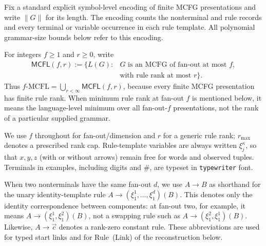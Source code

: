 \documentclass[11pt]{article}
\numberwithin{equation}{section}
\theoremstyle{plain}
\theoremstyle{definition}
\theoremstyle{remark}
\newcommand{\tuple}[1]{\vec{#1}}
\begin{document}
Fix a standard explicit symbol-level encoding of finite MCFG presentations and
write $\|G\|$ for its length.  The encoding counts the nonterminal and rule
records and every terminal or variable occurrence in each rule template.  All
polynomial grammar-size bounds below refer to this encoding.

For integers \(f\ge1\) and \(r\ge0\), write
\[
\begin{aligned}
  \mathsf{MCFL}(f,r):=\{L(G):{}&G\text{ is an MCFG of fan-out at most }f,\\
                   &\text{with rule rank at most }r\}.
\end{aligned}
\]
Thus \(f\text{-}\mathrm{MCFL}=\bigcup_{r<\infty}\mathsf{MCFL}(f,r)\), because every
finite MCFG presentation has finite rule rank.
When minimum rule rank at fan-out \(f\) is mentioned below, it means the
language-level minimum over all fan-out-\(f\) presentations, not the rank of a
particular supplied grammar.


We use $f$ throughout for fan-out/dimension and $r$ for a generic rule rank;
$r_{\max}$ denotes a prescribed rank cap.  Rule-template variables are always
written $\xi_j^\kappa$, so that $x,y,z$ (with or without arrows) remain free for
words and observed tuples.  Terminals in examples, including digits and
$\mathtt\#$, are typeset in \texttt{typewriter} font.


When two nonterminals have the same fan-out \(d\), we use
\(A\to B\)
as shorthand for the unary identity-template rule
\(A\to(\xi_1^1,\ldots,\xi_1^d)(B)\).  This denotes only the identity
correspondence between components: at fan-out two, for example, it means
\(A\to(\xi_1^1,\xi_1^2)(B)\), not a swapping rule such as
\(A\to(\xi_1^2,\xi_1^1)(B)\).
Likewise, \(A\to\tuple c\) denotes a rank-zero
constant rule.  These abbreviations are used for typed start links and for Rule~(Link) of the
reconstruction below.
\end{document}
